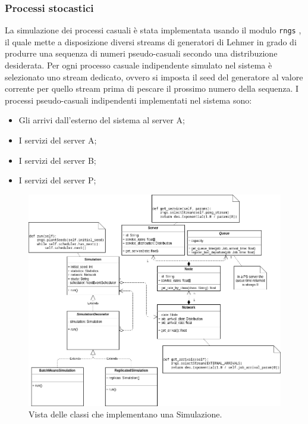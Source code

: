 \subsubsection{Processi stocastici}
La simulazione dei processi casuali è stata implementata usando il modulo \texttt{rngs} \citep{des}, il quale mette a disposizione diversi streams di generatori di Lehmer in grado di produrre una sequenza di numeri pseudo-casuali secondo una distribuzione desiderata. Per ogni processo casuale indipendente simulato nel sistema è selezionato uno stream dedicato, ovvero si imposta il seed del generatore al valore corrente per quello stream prima di pescare il prossimo numero della sequenza. I processi pseudo-casuali indipendenti implementati nel sistema sono:
\begin{itemize}
    \item Gli arrivi dall'esterno del sistema al server A;
    \item I servizi del server A;
    \item I servizi del server B;
    \item I servizi del server P;
\end{itemize}

\begin{figure}
    \centering
    \includegraphics[width=\linewidth]{figs/diagrams/simulation.drawio.png}
    \caption{Vista delle classi che implementano una Simulazione.}
    \label{fig:simulation_class_diagram}
\end{figure}

